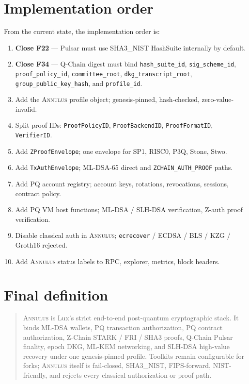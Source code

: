 \documentclass[11pt,a4paper]{article}
\newcommand{\Annulus}{\textsc{Annulus}}
\newcommand{\PQ}{\textsf{PQ}}
\begin{document}
\section{Implementation order}
\label{sec:impl-order}

From the current state, the implementation order is:

\begin{enumerate}[leftmargin=*, itemsep=0pt]
\item \textbf{Close F22} --- Pulsar must use SHA3\_NIST HashSuite
internally by default.
\item \textbf{Close F34} --- Q-Chain digest must bind
\texttt{hash\_suite\_id}, \texttt{sig\_scheme\_id},
\texttt{proof\_policy\_id}, \texttt{committee\_root},
\texttt{dkg\_transcript\_root}, \texttt{group\_public\_key\_hash},
and \texttt{profile\_id}.
\item Add the \Annulus{} profile object; genesis-pinned,
hash-checked, zero-value-invalid.
\item Split proof IDs: \texttt{ProofPolicyID},
\texttt{ProofBackendID}, \texttt{ProofFormatID},
\texttt{VerifierID}.
\item Add \texttt{ZProofEnvelope}; one envelope for SP1, RISC0,
P3Q, Stone, Stwo.
\item Add \texttt{TxAuthEnvelope}; ML-DSA-65 direct and
\texttt{ZCHAIN\_AUTH\_PROOF} paths.
\item Add \PQ{} account registry; account keys, rotations,
revocations, sessions, contract policy.
\item Add \PQ{} VM host functions; ML-DSA / SLH-DSA verification,
Z-auth proof verification.
\item Disable classical auth in \Annulus{}; \texttt{ecrecover}
/ ECDSA / BLS / KZG / Groth16 rejected.
\item Add \Annulus{} status labels to RPC, explorer, metrics,
block headers.
\end{enumerate}

\section{Final definition}
\label{sec:final}

\begin{quote}
\Annulus{} is Lux's strict end-to-end post-quantum cryptographic
stack. It binds ML-DSA wallets, \PQ{} transaction authorization,
\PQ{} contract authorization, Z-Chain STARK / FRI / SHA3 proofs,
Q-Chain Pulsar finality, epoch DKG, ML-KEM networking, and
SLH-DSA high-value recovery under one genesis-pinned profile.
Toolkits remain configurable for forks; \Annulus{} itself is
fail-closed, SHA3\_NIST, FIPS-forward, NIST-friendly, and rejects
every classical authorization or proof path.
\end{quote}
\end{document}
